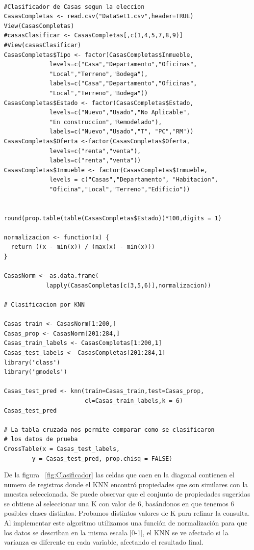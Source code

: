 \begin{verbatim}

#Clasificador de Casas segun la eleccion
CasasCompletas <- read.csv("DataSet1.csv",header=TRUE)
View(CasasCompletas)
#casasClasificar <- CasasCompletas[,c(1,4,5,7,8,9)]
#View(casasClasificar)
CasasCompletas$Tipo <- factor(CasasCompletas$Inmueble,
             levels=c("Casa","Departamento","Oficinas",
             "Local","Terreno","Bodega"),
             labels=c("Casa","Departamento","Oficinas",
             "Local","Terreno","Bodega"))
CasasCompletas$Estado <- factor(CasasCompletas$Estado,
             levels=c("Nuevo","Usado","No Aplicable",
             "En construccion","Remodelado"), 
             labels=c("Nuevo","Usado","T", "PC","RM"))
CasasCompletas$Oferta <-factor(CasasCompletas$Oferta,
             levels=c("renta","venta"),
             labels=c("renta","venta"))
CasasCompletas$Inmueble <- factor(CasasCompletas$Inmueble,
             levels = c("Casas","Departamento", "Habitacion", 
             "Oficina","Local","Terreno","Edificio"))


round(prop.table(table(CasasCompletas$Estado))*100,digits = 1)

normalizacion <- function(x) {
  return ((x - min(x)) / (max(x) - min(x)))
}

CasasNorm <- as.data.frame(
            lapply(CasasCompletas[c(3,5,6)],normalizacion))

# Clasificacion por KNN

Casas_train <- CasasNorm[1:200,]
Casas_prop <- CasasNorm[201:284,]
Casas_train_labels <- CasasCompletas[1:200,1]
Casas_test_labels <- CasasCompletas[201:284,1]
library('class')
library('gmodels')

Casas_test_pred <- knn(train=Casas_train,test=Casas_prop,
                       cl=Casas_train_labels,k = 6)
Casas_test_pred

# La tabla cruzada nos permite comparar como se clasificaron
# los datos de prueba
CrossTable(x = Casas_test_labels, 
        y = Casas_test_pred, prop.chisq = FALSE)
\end{verbatim}

De la figura ~\ref{fig:Clasificador} las celdas que caen en la diagonal contienen  el numero de registros  donde el KNN encontró propiedades que son similares  con la muestra seleccionada. Se  puede observar que el conjunto de propiedades sugeridas se obtiene al seleccionar  una K  con valor de 6, basándonos en que tenemos 6 posibles clases distintas. Probamos distintos valores de K para refinar la consulta. Al implementar este algoritmo utilizamos una función de normalización para  que los datos se describan en la misma escala [0-1], el  KNN se ve afectado si la varianza es diferente en cada variable, afectando el resultado final.

